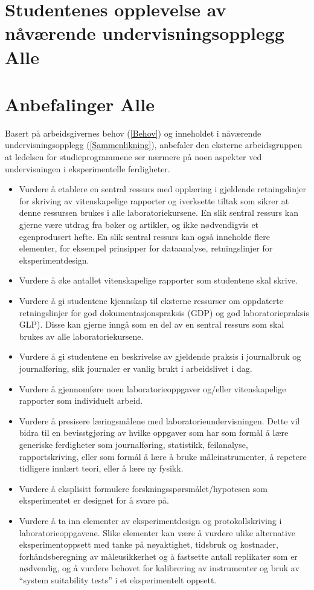\documentclass{article}
\begin{document}
\section{Studentenes opplevelse av nåværende undervisningsopplegg {\color{red}Alle}}

\section{Anbefalinger {\color{red}Alle}}
Basert på arbeidsgivernes behov (\cref{Behov}) og inneholdet i nåværende undervisningsopplegg (\cref{Sammenlikning}), anbefaler den eksterne arbeidsgruppen at ledelsen for studieprogrammene ser nærmere på noen aspekter ved undervisningen i eksperimentelle ferdigheter.
\begin{itemize}
  \item Vurdere å etablere en sentral ressurs med opplæring i gjeldende retningslinjer for skriving av vitenskapelige rapporter og iverksette tiltak som sikrer at denne  ressursen brukes i alle laboratoriekursene. En slik sentral ressurs kan gjerne være utdrag fra bøker og artikler, og ikke nødvendigvis et egenprodusert hefte. En slik sentral ressurs kan også inneholde flere elementer, for eksempel prinsipper for dataanalyse, retningslinjer for eksperimentdesign. \item Vurdere å øke antallet vitenskapelige rapporter som studentene skal skrive. 
  \item Vurdere å gi studentene kjennskap til eksterne ressurser om oppdaterte retningslinjer for god dokumentasjonspraksis (GDP) og god laboratoriepraksis GLP). Disse kan gjerne inngå som en del av en sentral ressurs som skal brukes av alle laboratoriekursene.
  \item Vurdere å gi studentene en beskrivelse av gjeldende praksis i journalbruk og journalføring, slik journaler er vanlig brukt i arbeidslivet i dag.
  \item Vurdere å gjennomføre noen laboratorieoppgaver og/eller vitenskapelige rapporter som individuelt arbeid.
  \item Vurdere å presisere læringsmålene med laboratorieundervisningen. Dette vil bidra til en bevisstgjøring av hvilke oppgaver som har som formål å lære generiske ferdigheter som journalføring, statistikk, feilanalyse, rapportskriving, eller som formål å lære å bruke måleinstrumenter, å repetere tidligere innlært teori, eller å lære ny fysikk. 
  \item Vurdere å eksplisitt formulere forskningsspørsmålet/hypotesen som eksperimentet er designet for å svare på.
  \item Vurdere å ta inn elementer av eksperimentdesign og protokollskriving i laboratorieoppgavene. Slike elementer kan være å vurdere ulike alternative eksperimentoppsett med tanke på nøyaktighet, tidsbruk og kostnader, forhåndsberegning av måleusikkerhet og å fastsette antall replikater som er nødvendig, og å vurdere behovet for kalibrering av instrumenter og bruk av ``system suitability tests'' i et eksperimentelt oppsett.
\end{itemize}
\end{document}
